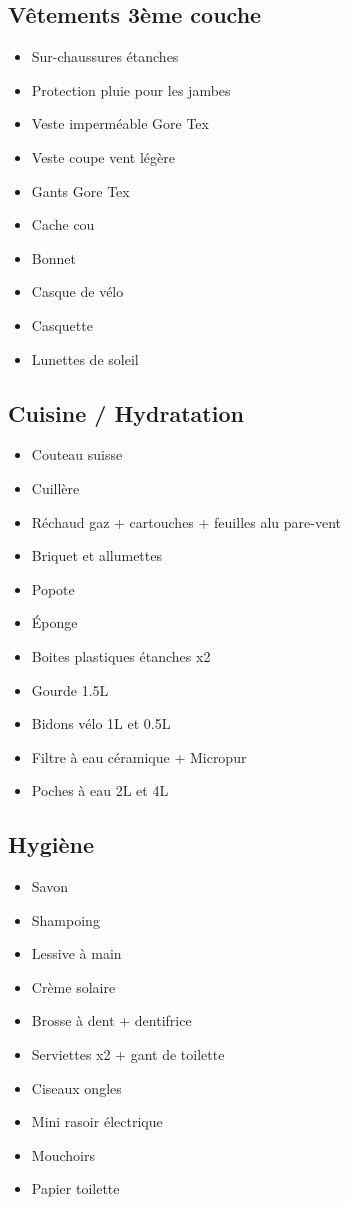   \subsection*{Vêtements 3ème couche}
 \begin{itemize}
 \item Sur-chaussures étanches
 \item Protection pluie pour les jambes
 \item Veste imperméable Gore Tex
 \item Veste coupe vent légère
 \item Gants Gore Tex
 \item Cache cou
 \item Bonnet
 \item Casque de vélo
 \item Casquette
 \item Lunettes de soleil
 \end{itemize}
 
  \subsection*{Cuisine / Hydratation}
 \begin{itemize}
 \item Couteau suisse
 \item Cuillère
 \item Réchaud gaz + cartouches + feuilles alu pare-vent
 \item Briquet et allumettes
 \item Popote
 \item Éponge
 \item Boites plastiques étanches x2
 \item Gourde 1.5L
 \item Bidons vélo 1L et 0.5L
 \item Filtre à eau céramique + Micropur
 \item Poches à eau 2L et 4L
 \end{itemize}
 
  \subsection*{Hygiène}
 \begin{itemize}
 \item Savon
 \item Shampoing
 \item Lessive à main
 \item Crème solaire
 \item Brosse à dent + dentifrice
 \item Serviettes x2 + gant de toilette
 \item Ciseaux ongles
 \item Mini rasoir électrique
 \item Mouchoirs
 \item Papier toilette
 \end{itemize}
 

